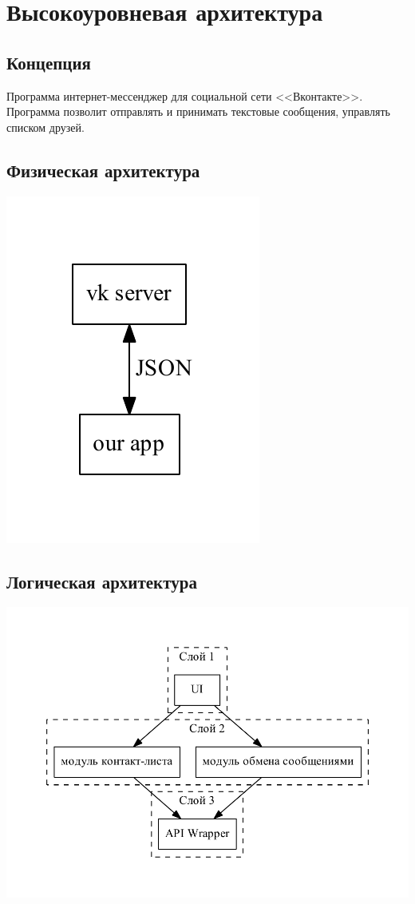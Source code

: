 \documentclass[12pt]{article}
\begin{document}
\section*{Высокоуровневая архитектура}

\subsection*{Концепция}

Программа интернет-мессенджер для социальной сети <<Вконтакте>>. Программа позволит отправлять и принимать текстовые сообщения, управлять списком друзей.

\subsection*{Физическая архитектура}
\includegraphics{./diag/phys.pdf}

\subsection*{Логическая архитектура}
\includegraphics{./diag/logic.pdf}
\end{document}
